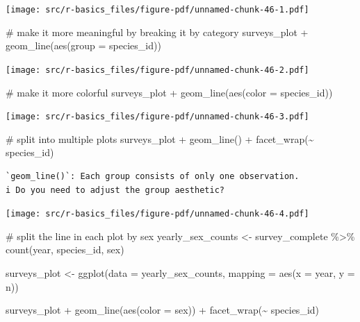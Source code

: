 \documentclass[
  letterpaper,
  DIV=11,
  numbers=noendperiod]{scrreprt}
\newenvironment{Shaded}{\begin{snugshade}}{\end{snugshade}}
\newcommand{\AttributeTok}[1]{\textcolor[rgb]{0.40,0.45,0.13}{#1}}
\newcommand{\CommentTok}[1]{\textcolor[rgb]{0.37,0.37,0.37}{#1}}
\newcommand{\FunctionTok}[1]{\textcolor[rgb]{0.28,0.35,0.67}{#1}}
\newcommand{\NormalTok}[1]{\textcolor[rgb]{0.00,0.23,0.31}{#1}}
\newcommand{\OtherTok}[1]{\textcolor[rgb]{0.00,0.23,0.31}{#1}}
\newcommand{\SpecialCharTok}[1]{\textcolor[rgb]{0.37,0.37,0.37}{#1}}
\begin{document}
\texttt{[image: src/r-basics\_files/figure-pdf/unnamed-chunk-46-1.pdf]}

\begin{Shaded}
\begin{Highlighting}[]
\CommentTok{\# make it more meaningful by breaking it by category}
\NormalTok{surveys\_plot }\SpecialCharTok{+} \FunctionTok{geom\_line}\NormalTok{(}\FunctionTok{aes}\NormalTok{(}\AttributeTok{group =}\NormalTok{ species\_id))}
\end{Highlighting}
\end{Shaded}

\texttt{[image: src/r-basics\_files/figure-pdf/unnamed-chunk-46-2.pdf]}

\begin{Shaded}
\begin{Highlighting}[]
\CommentTok{\# make it more colorful}
\NormalTok{surveys\_plot }\SpecialCharTok{+} \FunctionTok{geom\_line}\NormalTok{(}\FunctionTok{aes}\NormalTok{(}\AttributeTok{color =}\NormalTok{ species\_id))}
\end{Highlighting}
\end{Shaded}

\texttt{[image: src/r-basics\_files/figure-pdf/unnamed-chunk-46-3.pdf]}

\begin{Shaded}
\begin{Highlighting}[]
\CommentTok{\# split into multiple plots}
\NormalTok{surveys\_plot }\SpecialCharTok{+} \FunctionTok{geom\_line}\NormalTok{() }\SpecialCharTok{+} \FunctionTok{facet\_wrap}\NormalTok{(}\SpecialCharTok{\textasciitilde{}}\NormalTok{ species\_id)}
\end{Highlighting}
\end{Shaded}

\begin{verbatim}
`geom_line()`: Each group consists of only one observation.
i Do you need to adjust the group aesthetic?
\end{verbatim}

\texttt{[image: src/r-basics\_files/figure-pdf/unnamed-chunk-46-4.pdf]}

\begin{Shaded}
\begin{Highlighting}[]
\CommentTok{\# split the line in each plot by sex}
\NormalTok{yearly\_sex\_counts }\OtherTok{\textless{}{-}}\NormalTok{ survey\_complete }\SpecialCharTok{\%\textgreater{}\%}
    \FunctionTok{count}\NormalTok{(year, species\_id, sex)}

\NormalTok{surveys\_plot }\OtherTok{\textless{}{-}} \FunctionTok{ggplot}\NormalTok{(}\AttributeTok{data =}\NormalTok{ yearly\_sex\_counts, }
    \AttributeTok{mapping =} \FunctionTok{aes}\NormalTok{(}\AttributeTok{x =}\NormalTok{ year, }\AttributeTok{y =}\NormalTok{ n))}

\NormalTok{surveys\_plot }\SpecialCharTok{+} \FunctionTok{geom\_line}\NormalTok{(}\FunctionTok{aes}\NormalTok{(}\AttributeTok{color =}\NormalTok{ sex)) }\SpecialCharTok{+}
    \FunctionTok{facet\_wrap}\NormalTok{(}\SpecialCharTok{\textasciitilde{}}\NormalTok{ species\_id)}
\end{Highlighting}
\end{Shaded}
\end{document}
